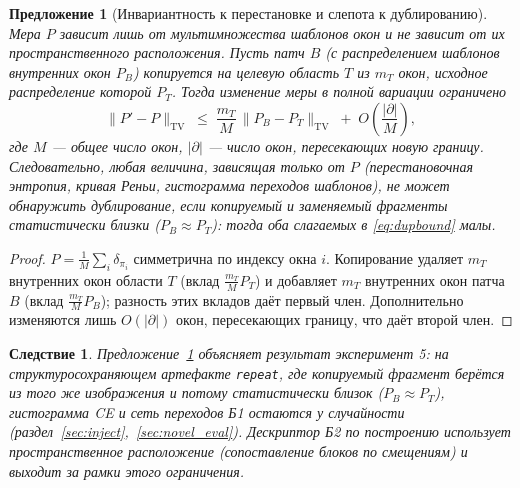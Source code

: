 \documentclass[14pt]{extarticle}
\theoremstyle{plain}
\newtheorem{proposition}{Предложение}
\newtheorem{corollary}{Следствие}
\numberwithin{equation}{section}
\numberwithin{figure}{section}
\numberwithin{table}{section}
\begin{document}
\begin{proposition}[Инвариантность к перестановке и слепота к дублированию]\label{prop:dup}
Мера $P$ зависит лишь от мультимножества шаблонов окон и не зависит от их
пространственного расположения. Пусть патч $B$ (с распределением шаблонов внутренних
окон $P_B$) копируется на целевую область $T$ из $m_T$ окон, исходное распределение
которой $P_T$. Тогда изменение меры в полной вариации ограничено
\begin{equation}
\bigl\lVert P'-P\bigr\rVert_{\mathrm{TV}}
\;\le\; \frac{m_T}{M}\,\bigl\lVert P_B-P_T\bigr\rVert_{\mathrm{TV}}
\;+\; O\!\left(\frac{|\partial|}{M}\right),
\label{eq:dupbound}
\end{equation}
где $M$ — общее число окон, $|\partial|$ — число окон, пересекающих новую границу.
Следовательно, любая величина, зависящая только от $P$ (перестановочная энтропия,
кривая Реньи, гистограмма переходов шаблонов), не может обнаружить дублирование,
если копируемый и заменяемый фрагменты статистически близки
($P_B\approx P_T$): тогда оба слагаемых в \eqref{eq:dupbound} малы.
\end{proposition}
\begin{proof}
$P=\frac{1}{M}\sum_i \delta_{\pi_i}$ симметрична по индексу окна $i$. Копирование
удаляет $m_T$ внутренних окон области $T$ (вклад $\tfrac{m_T}{M}P_T$) и добавляет
$m_T$ внутренних окон патча $B$ (вклад $\tfrac{m_T}{M}P_B$); разность этих вкладов
даёт первый член. Дополнительно изменяются лишь $O(|\partial|)$ окон, пересекающих
границу, что даёт второй член. \qedhere
\end{proof}

\begin{corollary}
Предложение~\ref{prop:dup} объясняет результат эксперимент 5: на структуросохраняющем
артефакте \texttt{repeat}, где копируемый фрагмент берётся из того же изображения и
потому статистически близок ($P_B\approx P_T$), гистограмма CE и сеть переходов Б1
остаются у случайности (раздел~\ref{sec:inject},~\ref{sec:novel_eval}). Дескриптор
Б2 по построению использует пространственное расположение (сопоставление блоков по
смещениям) и выходит за рамки этого ограничения.
\end{corollary}
\end{document}
